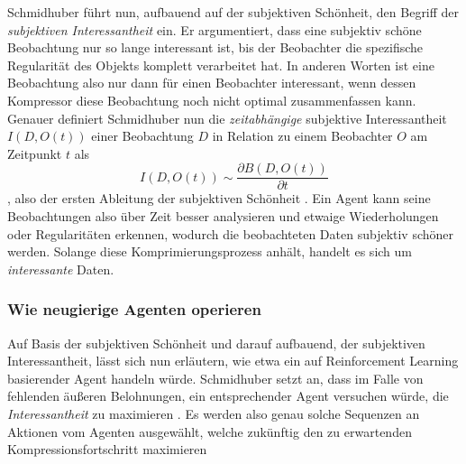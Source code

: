 Schmidhuber führt nun, aufbauend auf der subjektiven Schönheit, den Begriff der \emph{subjektiven Interessantheit} ein. 
Er argumentiert, dass eine subjektiv schöne Beobachtung nur so lange interessant ist, bis der Beobachter die spezifische Regularität des Objekts komplett verarbeitet hat.\cite[p.~7-8]{curiosity_schmidhuber} In anderen Worten ist eine Beobachtung also nur dann für einen Beobachter interessant, wenn dessen Kompressor diese Beobachtung noch nicht optimal zusammenfassen kann. \\

Genauer definiert Schmidhuber nun die \emph{zeitabhängige} subjektive Interessantheit \(I(D,O(t))\) einer Beobachtung \(D\) in Relation zu einem Beobachter \(O\) am Zeitpunkt \(t\) als 
\begin{equation}
    I(D,O(t)) \sim \frac{\partial B(D,O(t))}{\partial t}
\end{equation}
, also der ersten Ableitung der subjektiven Schönheit \cite[p.~8]{curiosity_schmidhuber}.
Ein Agent kann seine Beobachtungen also über Zeit besser analysieren und etwaige Wiederholungen oder Regularitäten erkennen, wodurch die beobachteten Daten subjektiv schöner werden. Solange diese Komprimierungsprozess anhält, handelt es sich um \emph{interessante} Daten. \cite[p.~8]{curiosity_schmidhuber}


\subsubsection{Wie neugierige Agenten operieren}
Auf Basis der subjektiven Schönheit und darauf aufbauend, der subjektiven Interessantheit, lässt sich nun erläutern, wie etwa ein auf Reinforcement Learning basierender Agent handeln würde. 
Schmidhuber setzt an, dass im Falle von fehlenden äußeren Belohnungen, ein entsprechender Agent versuchen würde, die \emph{Interessantheit} zu maximieren \cite[p.~8]{curiosity_schmidhuber}.
Es werden also genau solche Sequenzen an Aktionen vom Agenten ausgewählt, welche zukünftig den zu erwartenden Kompressionsfortschritt maximieren \cite[p.~8]{curiosity_schmidhuber}

